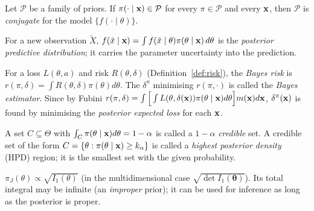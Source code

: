 \documentclass[main.tex]{subfiles}
\begin{document}
\begin{definition}
Let $\mathcal P$ be a family of priors. If $\pi(\cdot\mid\mathbf{x})\in\mathcal P$ for every $\pi\in\mathcal P$ and every $\mathbf{x}$, then $\mathcal P$ is \emph{conjugate} for the model $\{f(\cdot\mid\theta)\}$.
\end{definition}

\begin{definition}
For a new observation $\tilde X$, $f(\tilde x\mid\mathbf{x})=\int f(\tilde x\mid\theta)\pi(\theta\mid\mathbf{x})\,d\theta$ is the \emph{posterior predictive distribution}; it carries the parameter uncertainty into the prediction.
\end{definition}

\begin{definition}
For a loss $L(\theta,a)$ and risk $R(\theta,\delta)$ (Definition~\ref{def:risk}), the \emph{Bayes risk} is $r(\pi,\delta)=\int R(\theta,\delta)\pi(\theta)d\theta$. The $\delta^\pi$ minimising $r(\pi,\cdot)$ is called the \emph{Bayes estimator}. Since by Fubini $r(\pi,\delta)=\int\Big[\int L(\theta,\delta(\mathbf{x}))\pi(\theta\mid\mathbf{x})d\theta\Big]m(\mathbf{x})d\mathbf{x}$, $\delta^\pi(\mathbf{x})$ is found by minimising the \emph{posterior expected loss} for each $\mathbf{x}$.
\end{definition}

\begin{definition}
A set $C\subseteq\Theta$ with $\int_C\pi(\theta\mid\mathbf{x})d\theta=1-\alpha$ is called a $1-\alpha$ \emph{credible} set. A credible set of the form $C=\{\theta:\pi(\theta\mid\mathbf{x})\ge k_\alpha\}$ is called a \emph{highest posterior density} (HPD) region; it is the smallest set with the given probability.
\end{definition}

\begin{definition}
$\pi_J(\theta)\propto\sqrt{I_1(\theta)}$ (in the multidimensional case $\sqrt{\det I_1(\bm\theta)}$). Its total integral may be infinite (an \emph{improper} prior); it can be used for inference as long as the posterior is proper.
\end{definition}
\end{document}
